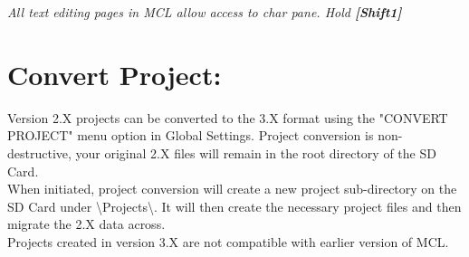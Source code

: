 \textit{All text editing pages in MCL allow access to char pane. Hold \textbf{[Shift1]}}

\section{Convert Project:}
Version 2.X projects can be converted to the 3.X format using the "CONVERT PROJECT"
menu option in Global Settings. Project conversion is non-destructive, your original 2.X
files will remain in the root directory of the SD Card.\\

When initiated, project conversion will create a new project sub-directory on the SD Card under \textbackslash Projects\textbackslash. It will then create the necessary project files and then migrate the 2.X data across.\\
Projects created in version 3.X are not compatible with earlier version of MCL.